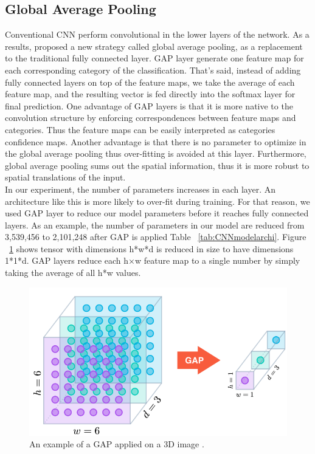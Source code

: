 \subsection{Global Average Pooling}
\hspace{5mm} Conventional CNN perform convolutional in the lower layers of the network. As a results, \cite{lin2013network} proposed a new strategy called global average pooling, as a replacement to the traditional fully connected layer. GAP layer generate one feature map for each corresponding category of the classification. That's said, instead of adding fully connected layers on top of the feature maps, we take the average of each feature map, and the resulting vector is fed directly into the softmax layer for final prediction. One advantage of GAP layers is that it is more native to the convolution structure by enforcing correspondences between
feature maps and categories. Thus the feature maps can be easily interpreted as categories confidence
maps. Another advantage is that there is no parameter to optimize in the global average pooling
thus over-fitting is avoided at this layer. Furthermore, global average pooling sums out the spatial
information, thus it is more robust to spatial translations of the input.\\

In our experiment, the number of parameters increases in each layer. An architecture like this is more likely to over-fit during training. For that reason, we used GAP layer to reduce our model parameters before it reaches fully connected layers. As an example, the number of parameters in our model are reduced from 3,539,456 to 2,101,248 after GAP is applied Table ~\ref{tab:CNNmodelarchi}. Figure ~\ref{fig:gap} shows tensor with dimensions h*w*d is reduced in size to have dimensions 1*1*d. GAP layers reduce each h×w feature map to a single number by simply taking the average of all h*w values.

\begin{figure}[ht]
\centering
\includegraphics[width=0.6\columnwidth]{Figures/gap}
\decoRule
\caption[An example of a GAP applied on a 3D image \cite{lin2013network}.]{An example of a GAP applied on a 3D image \cite{lin2013network}.}
\label{fig:gap}
\end{figure}

